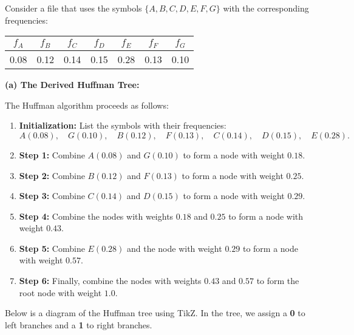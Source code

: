 \documentclass[11pt]{article}
\begin{document}
    Consider a file that uses the symbols $\{A,B,C,D,E,F,G\}$ with the corresponding frequencies:
    
    \begin{center}
    \begin{tabular}{c|c|c|c|c|c|c}
    $f_A$ & $f_B$ & $f_C$ & $f_D$ & $f_E$ & $f_F$ & $f_G$ \\ \hline
    0.08  & 0.12  & 0.14  & 0.15  & 0.28  & 0.13  & 0.10
    \end{tabular}
    \end{center}
    
    \vspace{0.2in}
    \textbf{(a) The Derived Huffman Tree:}
    
    The Huffman algorithm proceeds as follows:
    \begin{enumerate}
        \item \textbf{Initialization:} List the symbols with their frequencies:
        \[
        A(0.08),\quad G(0.10),\quad B(0.12),\quad F(0.13),\quad C(0.14),\quad D(0.15),\quad E(0.28).
        \]
        \item \textbf{Step 1:} Combine $A(0.08)$ and $G(0.10)$ to form a node with weight $0.18$.
        \item \textbf{Step 2:} Combine $B(0.12)$ and $F(0.13)$ to form a node with weight $0.25$.
        \item \textbf{Step 3:} Combine $C(0.14)$ and $D(0.15)$ to form a node with weight $0.29$.
        \item \textbf{Step 4:} Combine the nodes with weights $0.18$ and $0.25$ to form a node with weight $0.43$.
        \item \textbf{Step 5:} Combine $E(0.28)$ and the node with weight $0.29$ to form a node with weight $0.57$.
        \item \textbf{Step 6:} Finally, combine the nodes with weights $0.43$ and $0.57$ to form the root node with weight $1.0$.
    \end{enumerate}
    
    Below is a diagram of the Huffman tree using TikZ. In the tree, we assign a \textbf{0} to left branches and a \textbf{1} to right branches.
    
\end{document}
